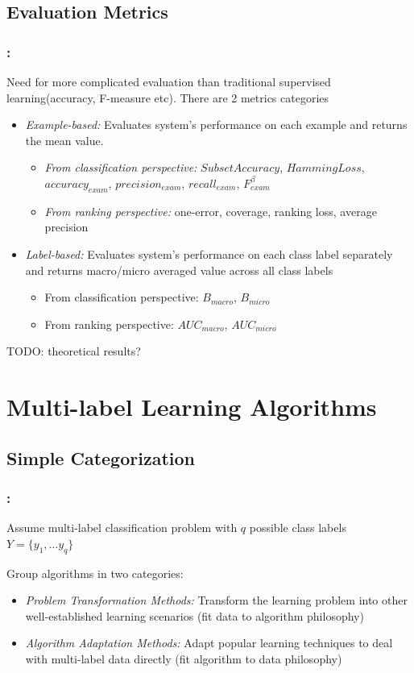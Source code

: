 \documentclass{beamer}
\begin{document}
\subsection{Evaluation Metrics}
\begin{frame}
\frametitle{\insertsection : \insertsubsection}
Need for more complicated evaluation than traditional supervised learning(accuracy, F-measure etc). There are 2 metrics categories 
	\begin{itemize}
		\item \emph{Example-based: }Evaluates system's performance on each example and returns the mean value. 
		\begin{itemize}
			\item \emph{From classification perspective:} $Subset Accuracy$, $Hamming Loss$, $accuracy_{exam}$, $precision_{exam}$, $recall_{exam}$, $F^\beta_{exam}$
			\item \emph{From ranking perspective:} one-error, coverage, ranking loss, average precision
		\end{itemize}
		\item \emph{Label-based: }Evaluates system's performance on each class label separately and returns macro/micro averaged value across all class labels
		\begin{itemize}
			\item From classification perspective: $B_{macro}$, $B_{micro}$
			\item From ranking perspective: $AUC_{macro}$, $AUC_{micro}$
		\end{itemize}
	\end{itemize}
TODO: theoretical results?
\end{frame}
\section{Multi-label Learning Algorithms}

\subsection{Simple Categorization}

\begin{frame}
\frametitle{\insertsection : \insertsubsection}

Assume multi-label classification problem with $q$ possible class labels $Y=\{y_1, \dots y_q\}$

Group algorithms in two categories:
\begin{itemize}
	\item \emph{Problem Transformation Methods: }Transform the learning problem into other well-established learning scenarios (fit data to algorithm philosophy)
	\item \emph{Algorithm Adaptation Methods: }Adapt popular learning techniques to deal with multi-label data directly (fit algorithm to data philosophy)
\end{itemize}
\end{frame}
\end{document}

